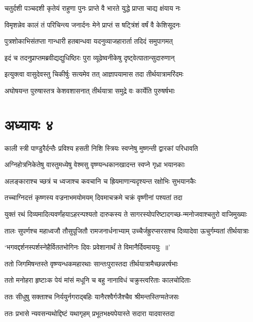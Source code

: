 \twolineshloka
{चतुर्दशी पञ्चदशी कृतेयं राहुणा पुनः}
{प्राप्ते वै भारते युद्धे प्राप्ता चाद्य क्षंयाय नः}


\twolineshloka
{विमृशन्नेव कालं तं परिचिन्त्य जनार्दनः}
{मेने प्राप्तं स षट्त्रिंशं वर्षं वै केशिसूदनः}


\twolineshloka
{पुत्रशोकाभिसंतप्ता गान्धारी हतबान्धवा}
{यदनुव्याजहारार्ता तदिदं समुपागमत्}


\twolineshloka
{इदं च तदनुप्राप्तमब्रवीद्यद्युधिष्ठिरः}
{पुरा व्यूढेष्वनीकेषु दृष्ट्वेत्पातान्सुदारुणान्}


\twolineshloka
{इत्युक्त्वा वासुदेवस्तु चिकीर्षुः सत्यमेव तत्}
{आज्ञापयामास तदा तीर्थयात्रामरिंदमः}


\twolineshloka
{अघोषयन्त पुरुषास्तत्र केशवशासनात्}
{तीर्थयात्रा समुद्रे वः कार्येति पुरुषर्षभाः}


\chapter{अध्यायः ४}
\twolineshloka
{काली स्त्री पाण्डुरैर्दन्तैः प्रविश्य हसती निशि}
{स्त्रियः स्वप्नेषु मुष्णन्ती द्वारकां परिधावति}


\twolineshloka
{अग्निहोत्रनिकेतेषु वास्तुमध्येषु वेश्मसु}
{वृष्ण्यन्धकानखादन्त स्वप्ने गृध्रा भयानकाः}


\twolineshloka
{अलङ्काराश्च च्छत्रं च ध्वजाश्च कवचानि च}
{ह्रियमाणान्यदृश्यन्त रक्षोभिः सुभयानकैः}


\twolineshloka
{तच्चाग्निदत्तं कृष्णस्य वज्रनाभमयोमयम्}
{दिवमाचक्रमे चक्रं वृष्णीनां पश्यतां तदा}


\twolineshloka
{युक्तं रथं दिव्यमादित्यवर्णंहयाऽहरन्पश्यतो दारुकस्य}
{ते सागरस्योपरिष्टादगच्छ-न्मनोजवाश्चतुरो वाजिमुख्याः}


\twolineshloka
{तालः सुपर्णश्च महाध्वजौ तौसुपूजितौ रामजनार्धनाभ्याम्}
{उच्चैर्जह्रुरप्सरसश्च दिव्यादेवा ऊचुर्गम्यतां तीर्थयात्राः}


\twolineshloka
{`भगवद्दर्शनस्पर्शस्नेहैर्विततभोगिनः}
{दिवः प्रवेशानार्थं ते विमानैर्दिवमाययुः ॥'}


\twolineshloka
{ततो जिगमिषन्तस्ते वृष्ण्यन्धकमहारथाः}
{सान्तःपुरास्तदा तीर्थयात्रामैच्छन्नरर्षभाः}


\twolineshloka
{ततो मनोहरा हृष्टाःक पेयं मांसं मधूनि च}
{बहु नानाविधं चक्रुस्त्वरिताः कालचोदिताः}


\twolineshloka
{ततः सीधुषु सक्ताश्च निर्ययुर्नगराद्बहिः}
{यानैरश्वैर्गजैश्चैव श्रीमन्तस्तिग्मतेजसः}


\twolineshloka
{ततः प्रभासे न्यवसन्यथोद्दिष्टं यथागृहम्}
{प्रभूतभक्ष्यपेयास्ते सदारा यादवास्तदा}


